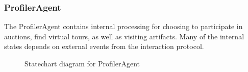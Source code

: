 \documentclass[paper=letter, fontsize=12pt]{article}
\begin{document}
\subsubsection{ProfilerAgent}
The ProfilerAgent contains internal processing for choosing to participate in auctions, find virtual tours, as well as visiting artifacts. Many of the internal states depends on external events from the interaction protocol.
\begin{figure}[H]
  \begin{center}
    \caption{Statechart diagram for ProfilerAgent}
    \label{fig:profiler_state}
  \end{center}
\end{figure}
\end{document}
